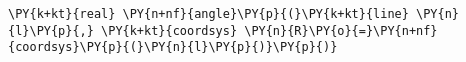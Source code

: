 \begin{Verbatim}[commandchars=\\\{\}]
    \PY{k+kt}{real} \PY{n+nf}{angle}\PY{p}{(}\PY{k+kt}{line} \PY{n}{l}\PY{p}{,} \PY{k+kt}{coordsys} \PY{n}{R}\PY{o}{=}\PY{n+nf}{coordsys}\PY{p}{(}\PY{n}{l}\PY{p}{)}\PY{p}{)}
\end{Verbatim}

